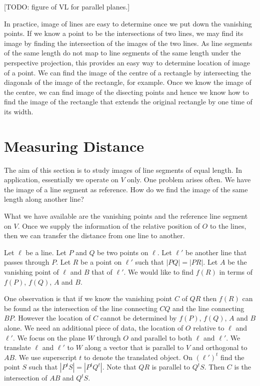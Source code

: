 \documentclass{amsart}
\begin{document}
[TODO: figure of VL for parallel planes.]

In practice, image of lines are easy to determine once we put down the vanishing points. If we know a point to be the intersections of two lines, we may find its image by finding the intersection of the images of the two lines. As line segments of the same length do not map to line segments of the same length under the perspective projection, this provides an easy way to determine location of image of a point. We can find the image of the centre of a rectangle by intersecting the diagonals of the image of the rectangle, for example. Once we know the image of the centre, we can find image of the disecting points and hence we know how to find the image of the rectangle that extends the original rectangle by one time of its width.

\section{Measuring Distance}
\label{sec:transfer-distance}

The aim of this section is to study images of line segments of equal length. In application, essentially we operate on $V$ only. One problem arises often. We have the image of a line segment as reference. How do we find the image of the same length along another line?

What we have available are the vanishing points and the reference line segment on $V$. Once we supply the information of the relative position of $O$ to the lines, then we can transfer the distance from one line to another.

Let $\ell$ be a line. Let $P$ and $Q$ be two points on $\ell$.  Let $\ell'$ be another line that passes through $P$. Let $R$ be a point on $\ell'$ such that $|PQ|=|PR|$. Let $A$ be the vanishing point of $\ell$ and $B$ that of $\ell'$. We would like to find $f (R)$ in terms of $f (P)$, $f (Q)$, $A$ and $B$.

One  observation is that if we know the vanishing point $C$ of $QR$ then $f (R)$ can be found as the intersection of the line connecting $CQ$ and the line connecting $BP$. However the location of $C$ cannot be determined by $f (P)$, $f (Q)$, $A$ and $B$ alone.  We need an additional piece of data,  the location of $O$ relative to $\ell$ and $\ell'$. We focus on the plane $W$ through $O$ and parallel to both $\ell$ and $\ell'$. We translate $\ell$ and $\ell'$ to $W$ along a vector that is parallel to $V$ and orthogonal to $AB$. We use superscript $t$ to denote the translated object. On $(\ell')^t$ find the point $S$ such that $|P^tS|=|P^tQ^t|$. Note that $QR$ is parallel to $Q^tS$. Then $C$ is the intersection of $AB$ and $Q^tS$.
\end{document}
